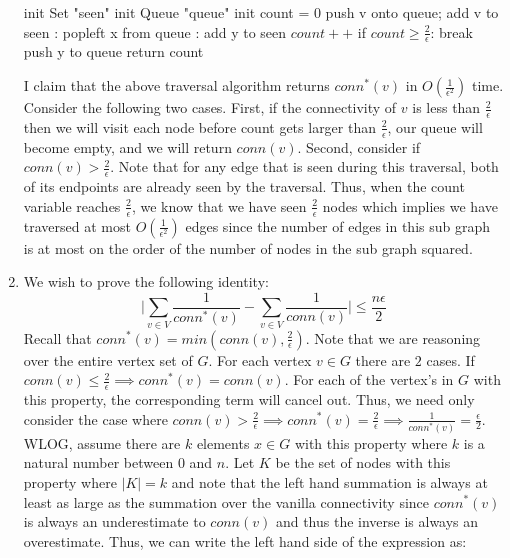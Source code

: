 \documentclass[12pt]{article}
\begin{document}
\begin{solution}
\begin{enumerate}[label=(\alph*)]
    \begin{answerbox}
    \begin{algorithmic}[1]
    \State init Set "seen" 
    \State init Queue "queue"
    \State init count = 0 
    \State push v onto queue; add v to seen
    : 
        \State popleft x from queue
        :
            \State add y to seen
            \State $count++$
            \State if $count \geq \frac{2}{\epsilon}$: break
            \State push y to queue
        \EndFor
    \EndWhile
    \State return count
    \EndProcedure
    \end{algorithmic}
    \end{answerbox}
    I claim that the above traversal algorithm returns $conn^*(v)$ in $O(\frac{1}{\epsilon^2})$ time. Consider the following two cases. First, if the connectivity of $v$ is less than $\frac{2}{\epsilon}$ then we will visit each node before count gets larger than $\frac{2}{\epsilon}$, our queue will become empty, and we will return $conn(v)$. Second, consider if $conn(v) > \frac{2}{\epsilon}$. Note that for any edge that is seen during this traversal, both of its endpoints are already seen by the traversal. Thus, when the count variable reaches $\frac{2}{\epsilon}$, we know that we have seen $\frac{2}{\epsilon}$ nodes which implies we have traversed at most $O(\frac{1}{\epsilon^2})$ edges since the number of edges in this sub graph is at most on the order of the number of nodes in the sub graph squared.
    \item We wish to prove the following identity:
    \[
    \big| \sum_{v\in V}{\frac{1}{conn^*(v)}} - \sum_{v\in V}{\frac{1}{conn(v)}} \big| \leq \frac{n\epsilon}{2}
    \]
    Recall that $conn^*(v) = min(conn(v), \frac{2}{\epsilon})$. Note that we are reasoning over the entire vertex set of $G$. For each vertex $v\in G$ there are $2$ cases. If $conn(v) \leq \frac{2}{\epsilon} \implies conn^*(v) = conn(v)$. For each of the vertex's in $G$ with this property, the corresponding term will cancel out. Thus, we need only consider the case where $conn(v) > \frac{2}{\epsilon} \implies conn^*(v) = \frac{2}{\epsilon} \implies \frac{1}{conn^*(v)} = \frac{\epsilon}{2}$. WLOG, assume there are $k$ elements $x\in G$ with this property where $k$ is a natural number between $0$ and $n$. Let $K$ be the set of nodes with this property where $|K| = k$ and note that the left hand summation is always at least as large as the summation over the vanilla connectivity since $conn^*(v)$ is always an underestimate to $conn(v)$ and thus the inverse is always an overestimate. Thus, we can write the left hand side of the expression as:

\end{enumerate}
\end{solution}
\end{document}

